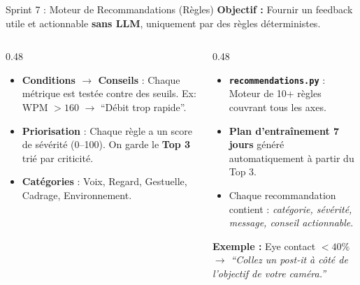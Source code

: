 \documentclass[10pt,aspectratio=169]{beamer}
\begin{document}
\begin{frame}{Sprint 7 : Moteur de Recommandations (Règles)}
    \small \textbf{Objectif :} Fournir un feedback utile et actionnable \textbf{sans LLM}, uniquement par des règles déterministes.
    
    \vspace{0.2cm}
    \begin{columns}[T]
        \begin{column}{0.48\textwidth}
            \begin{tcolorbox}[title=Logique du Moteur, colframe=primary, colback=primary!3]
                \scriptsize
                \begin{itemize}
                    \item \textbf{Conditions $\rightarrow$ Conseils} : Chaque métrique est testée contre des seuils. Ex: WPM $>160$ $\rightarrow$ ``Débit trop rapide''.
                    \item \textbf{Priorisation} : Chaque règle a un score de sévérité (0--100). On garde le \textbf{Top 3} trié par criticité.
                    \item \textbf{Catégories} : Voix, Regard, Gestuelle, Cadrage, Environnement.
                \end{itemize}
            \end{tcolorbox}
        \end{column}
        \begin{column}{0.48\textwidth}
            \begin{tcolorbox}[title=Livrables du Sprint 7, colframe=success, colback=success!3]
                \scriptsize
                \begin{itemize}
                    \item \textbf{\texttt{recommendations.py}} : Moteur de 10+ règles couvrant tous les axes.
                    \item \textbf{Plan d'entraînement 7 jours} généré automatiquement à partir du Top 3.
                    \item Chaque recommandation contient : \textit{catégorie, sévérité, message, conseil actionnable}.
                \end{itemize}
            \end{tcolorbox}
            \vspace{0.2cm}
            \begin{tcolorbox}[colback=accent!5, colframe=accent!40]
                \scriptsize
                \textbf{Exemple :} Eye contact $<40\%$ $\rightarrow$ \textit{``Collez un post-it à côté de l'objectif de votre caméra.''}
            \end{tcolorbox}
        \end{column}
    \end{columns}
\end{frame}
\end{document}
